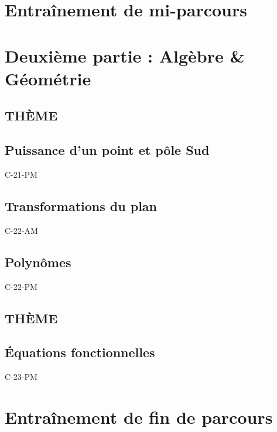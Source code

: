 \documentclass[poly,trombi]{valbonne}
\begin{document}
\section{Entraînement de mi-parcours}



\section{Deuxième partie : Algèbre \& Géométrie}

\subsection{THÈME}


\subsection{Puissance d'un point et pôle Sud}

{C-21-PM}

\subsection{Transformations du plan}

{C-22-AM}

\subsection{Polynômes}

{C-22-PM}

\subsection{THÈME}


\subsection{Équations fonctionnelles}

{C-23-PM}


\section{Entraînement de fin de parcours}
\end{document}
